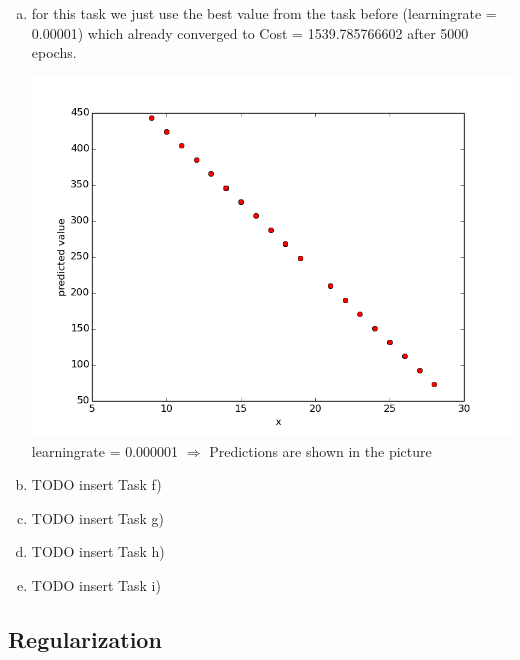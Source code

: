 \documentclass[12pt]{article}
\begin{document}
\begin{enumerate}[a)]
    \item 
        for this task we just use the best value from the task before (learningrate = 0.00001) which already converged to Cost = 1539.785766602 after 5000 epochs. 
		\begin{center}
                    \includegraphics[scale = 0.52]{pictures/onedimprediction.png}\\
                    learningrate = 0.000001 $\Rightarrow$ Predictions are shown in the picture\\
         \end{center}
    \item 
        TODO insert Task f)

    \item 
        TODO insert Task g)

    \item 
        TODO insert Task h)

    \item 
        TODO insert Task i)

\end{enumerate}

\subsection{Regularization}
\end{document}
